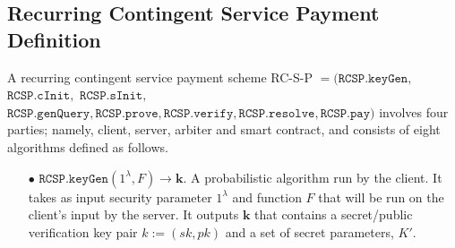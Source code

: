 
\subsection{Recurring Contingent Service Payment Definition}\label{sec::RC-S-P-Definition}


\begin{definition}[RC-S-P Scheme]\label{RC-S-P-def}
A recurring contingent service payment scheme RC-S-P  $=(\mathtt{RCSP}.\mathtt{keyGen}, $ $\mathtt{RCSP}.\mathtt{cInit}, $ $\mathtt{RCSP}.\mathtt{sInit},  $ $\mathtt{RCSP}.\mathtt{genQuery},\mathtt{RCSP}.\mathtt{prove},\mathtt{RCSP}.\mathtt{verify},\mathtt{RCSP}.\mathtt{resolve},\mathtt{RCSP}.\mathtt{pay})$ involves four parties; namely, client, server, arbiter and smart contract, and consists of eight algorithms defined as follows.


\begin{itemize}

\item[$\bullet$] $\mathtt{RCSP}.\mathtt{keyGen}(1^{\scriptscriptstyle\lambda},F)\rightarrow \bm{k}$.  A probabilistic algorithm run by the client. It takes as input security parameter $1^\lambda$  and  function $F$ that will be run on the client's input by the server. It outputs $\bm{k}$ that contains a secret/public verification key pair $k:=(sk,pk)$ and a set of secret parameters, $K'$. %

\


\end{itemize}
\end{definition}
